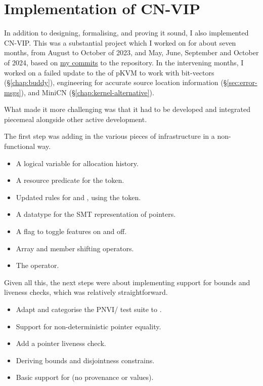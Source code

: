 \chapter{Implementation of CN-VIP}\label{chap:impl-cnvip}

\margintoc{}

In addition to designing, formalising, and proving it sound, I also implemented
CN-VIP\@. This was a substantial project which I worked on for about seven
months, from August to October of 2023, and May, June, September and October
of 2024, based on
\href{https://github.com/search?q=repo\%3Arems-project\%2Fcerberus+author\%3Adc-mak\&type=commits\&s=committer-date\&o=asc}{my
commits} to the  repository. In the intervening months, I worked
on a failed update to the  of pKVM to work with bit-vectors
(\S\ref{chap:buddy}), engineering for accurate source location information
(\S\ref{sec:error-msgs}), and MiniCN (\S\ref{chap:kernel-alternative}).

What made it more challenging was that it had to be developed and integrated
piecemeal alongside other active  development.

The first step was adding in the various pieces of infrastructure in a non-functional way.
\begin{itemize}
    \item A logical variable for allocation history.
    \item A resource predicate for the  token.
    \item Updated rules for  and , using the  token.
    \item A datatype for the SMT representation of pointers.
    \item A flag to toggle  features on and off.
    \item Array and member shifting operators.
    \item The  operator.
\end{itemize}

Given all this, the next steps were about implementing support for bounds and
liveness checks, which was relatively straightforward.
\begin{itemize}
    \item Adapt and categorise the PNVI/ test suite to \@.
    \item Support for non-deterministic pointer equality.
    \item Add a pointer liveness check.
    \item Deriving bounds and disjointness constrains.
    \item Basic support for  (no provenance or
         values).
\end{itemize}


